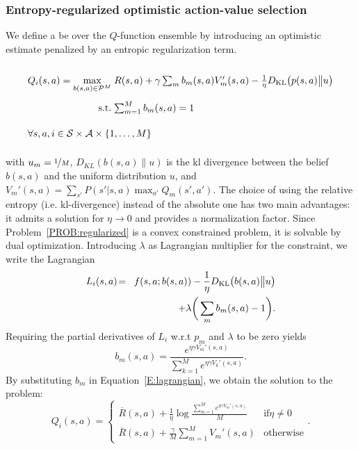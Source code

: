 \subsubsection{Entropy-regularized optimistic action-value selection}
We define a \gls{be} over the $Q$-function ensemble by introducing an optimistic estimate penalized by an entropic regularization term.
\begin{probdef}
\begin{equation}
\arraycolsep=1.4pt\def\arraystretch{2.2}
\begin{array}{rrclcl}
\displaystyle Q_i(s,a) = \max_{b(s,a) \in \mathcal{P}^M} & \multicolumn{3}{l}{R(s,a) + \gamma \sum_m{b}_m(s,a)V_m'(s,a)-\frac{1}{\eta}D_{\mathrm{KL}}\big(p(s,a)\big{\|}u\big) } \\
\textrm{s.t.} & \sum_{m=1}^{M} b_m(s,a) & = & 1 \\
\multicolumn{4}{l}{ \forall s,a,i \in \mathcal{S} \times \mathcal{A} \times \{1,\dots,M\}}
\end{array}\nonumber
\end{equation}\label{PROB:regularized}
\end{probdef}
\noindent with $u_m  =  \nicefrac{1}{M}$, $D_{KL}(b(s,a)\| u)$ is the \gls{kl} divergence between the belief $b(s,a)$ and the uniform distribution $u$, and $V_m'(s,a) \! = \! \sum_{s'} P(s'|s,a)\max_{a'}Q_m(s',a')$.
The choice of using the relative entropy (i.e. \gls{kl}-divergence) instead of the absolute one has two main advantages: it admits a solution for $\eta \to 0$ and provides a normalization factor.
Since Problem~\ref{PROB:regularized} is a convex constrained problem, it is solvable by dual optimization. Introducing $\lambda$ as Lagrangian multiplier for the constraint, we write the Lagrangian
\begin{eqnarray}
L_i(s,a) \!&=& \!f(s,a; b(s,a)) -\frac{1}{\eta}D_{\mathrm{KL}}\big(b(s,a)\big{\|}u\big)\nonumber \\ && + \lambda\bigg(\sum_m b_m(s,a) - 1\bigg).\label{E:lagrangian}
\end{eqnarray}
Requiring the partial derivatives of $L_i$ w.r.t $p_m$ and $\lambda$ to be zero yields 
\begin{equation}
b_m(s,a) = \frac{e^{\eta  \gamma V_m'(s,a)}}{\sum_{k=1}^{M} e^{\eta \gamma   V_k'(s,a)}}\label{pm}.
\end{equation} 
By substituting $b_m$ in Equation~\ref{E:lagrangian}, we obtain the solution to the problem:
\begin{equation}
Q_i(s,a) = \begin{cases}
\overline{R}(s,a) + \frac{1}{\eta} \log \frac{\sum_{m=1}^Me^{\eta \gamma  V_m'(s,a) }}{M} & \mathrm{if} \eta \neq 0 \label{OBE} \\
\overline{R}(s,a) + \frac{\gamma}M \sum_{m=1}^{M} V_m'(s,a) & \mathrm{otherwise}
\end{cases}.
\end{equation}
